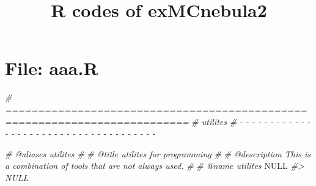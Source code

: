 \documentclass[
]{article}
\title{R codes of exMCnebula2}
\author{}
\date{\vspace{-2.5em}}
\newenvironment{Shaded}{\begin{snugshade}}{\end{snugshade}}
\newcommand{\CommentTok}[1]{\textcolor[rgb]{0.56,0.35,0.01}{\textit{#1}}}
\newcommand{\ConstantTok}[1]{\textcolor[rgb]{0.00,0.00,0.00}{#1}}
\begin{document}
\maketitle

{
\setcounter{tocdepth}{3}
\tableofcontents
}
\hypertarget{file-aaa.r}{%
\section{File: aaa.R}\label{file-aaa.r}}

\begin{Shaded}
\begin{Highlighting}[]
\CommentTok{\# ==========================================================================}
\CommentTok{\# utilites}
\CommentTok{\# {-} {-} {-} {-} {-} {-} {-} {-} {-} {-} {-} {-} {-} {-} {-} {-} {-} {-} {-} {-} {-} {-} {-} {-} {-} {-} {-} {-} {-} {-} {-} {-} {-} {-} {-} {-} {-}}

\CommentTok{\#\textquotesingle{} @aliases utilites}
\CommentTok{\#\textquotesingle{}}
\CommentTok{\#\textquotesingle{} @title utilites for programming}
\CommentTok{\#\textquotesingle{}}
\CommentTok{\#\textquotesingle{} @description This is a combination of tools that are not always used.}
\CommentTok{\#\textquotesingle{}}
\CommentTok{\#\textquotesingle{} @name utilites}
\ConstantTok{NULL}
\CommentTok{\#\textgreater{} NULL}


\end{Highlighting}
\end{Shaded}
\end{document}
